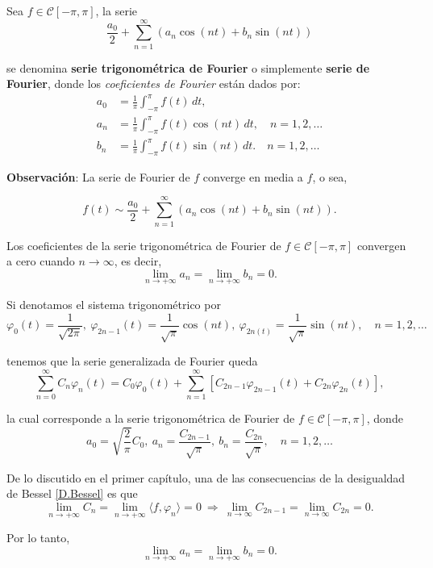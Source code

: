 \begin{defi}
Sea $f \in \mathcal{C}[-\pi,\pi]$, la serie 
\begin{equation}
    \frac{a_0}{2} + \sum_{n=1}^{\infty} ( a_n \cos(nt) + b_n \sin(nt)) \label{FourierTrigo}
\end{equation}

se denomina \textbf{serie trigonométrica de Fourier} o simplemente \textbf{serie de Fourier}, donde los \textit{coeficientes de Fourier} están dados por:
\begin{align*}
    a_0 &= \frac{1}{\pi} \int_{-\pi}^{\pi} f(t) \,dt, \\
    a_n &= \frac{1}{\pi} \int_{-\pi}^{\pi} f(t) \cos(nt) \,dt, \quad n = 1,2, \dots\\
    b_n &= \frac{1}{\pi} \int_{-\pi}^{\pi} f(t) \sin(nt) \,dt. \quad n = 1,2, \dots
\end{align*}
\end{defi}

\textbf{Observación}: La serie de Fourier de $f$ converge en media a $f$, o sea, 
\begin{shaded}
$$f(t) \sim \frac{a_0}{2} + \sum_{n=1}^{\infty} (a_n \cos(nt) + b_n \sin(nt)).$$    
\end{shaded}

\begin{propo} \label{C.FourierCero}
Los coeficientes de la serie trigonométrica de Fourier de $f \in \mathcal{C}[-\pi,\pi]$ convergen a cero cuando $n \to \infty$, es decir,
$$\lim_{n \to + \infty} a_n = \lim_{n \to + \infty} b_n = 0.$$
\end{propo}

\begin{demo}
Si denotamos el sistema trigonométrico por 
$$\varphi_0(t) = \frac{1}{\sqrt{2\pi}}, ~ \varphi_{2n-1}(t) = \frac{1}{\sqrt{\pi}} \cos(nt), ~ \varphi_{2n(t)} = \frac{1}{\sqrt{\pi}} \sin(nt), \quad n = 1,2, \dots$$

tenemos que la serie generalizada de Fourier queda
$$\sum_{n=0}^{\infty} C_n \varphi_n(t) = C_0 \varphi_0(t) + \sum_{n=1}^{\infty} \left[ C_{2n-1} \varphi_{2n-1}(t) + C_{2n} \varphi_{2n}(t) \right] ,$$

la cual corresponde a la serie trigonométrica de Fourier de $f \in \mathcal{C}[-\pi,\pi]$, donde 
$$a_0 = \sqrt{\frac{2}{\pi}} C_0, ~ a_n = \frac{C_{2n-1}}{\sqrt{\pi}}, ~ b_n = \frac{C_{2n}}{\sqrt{\pi}}, \quad n = 1,2, \dots$$

De lo discutido en el primer capítulo, una de las consecuencias de la desigualdad de Bessel \eqref{D.Bessel} es que 
$$\lim_{n \to + \infty} C_n = \lim_{n \to + \infty} \langle f, \varphi_n \rangle = 0 ~\Rightarrow~ \lim_{n \to \infty} C_{2n-1} = \lim_{n \to \infty} C_{2n} = 0. $$

Por lo tanto, 
$$\lim_{n \to + \infty} a_n = \lim_{n \to + \infty} b_n = 0.$$

\end{demo}

